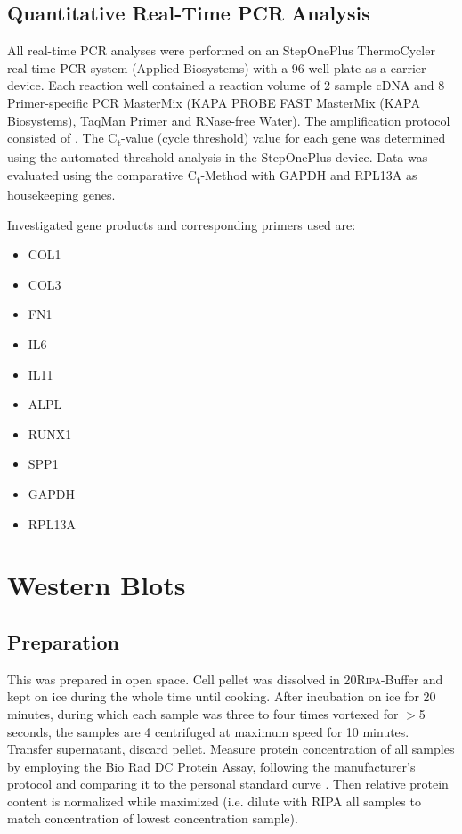 \subsection{Quantitative Real-Time PCR Analysis}

All real-time PCR analyses were performed on an StepOnePlus  ThermoCycler real-time PCR system (Applied Biosystems) with a 96-well plate as a carrier device. Each reaction well contained a reaction volume of 2\mul{} sample cDNA and 8\mul{} Primer-specific PCR MasterMix (KAPA PROBE FAST MasterMix (KAPA Biosystems), TaqMan\textregistered{} Primer and RNase-free Water). The amplification protocol consisted of . The C\textsubscript{t}-value (cycle threshold) value for each gene was determined using the automated threshold analysis in the StepOnePlus device. Data was evaluated using the comparative C\textsubscript{t}-Method with GAPDH and RPL13A as housekeeping genes.

Investigated gene products and corresponding primers used are: 
\begin{itemize}
\item COL1
\item COL3
\item FN1
\item IL6
\item IL11
\item ALPL
\item RUNX1
\item SPP1
\item GAPDH 
\item RPL13A
\end{itemize}

\section{Western Blots}
\subsection{Preparation}
This was prepared in open space. 
Cell pellet was dissolved in 20\mul \textsc{Ripa}-Buffer and kept on ice during the whole time until cooking. After incubation on ice for 20 minutes, during which each sample was three to four times vortexed for $>$5 seconds, the samples are 4 \degC centrifuged at maximum speed for 10 minutes. Transfer supernatant, discard pellet. Measure protein concentration of all samples by employing the Bio Rad DC Protein Assay, following the manufacturer's protocol and comparing it to the personal standard curve . Then relative protein content is normalized while maximized (i.e. dilute with RIPA all samples to match concentration of lowest concentration sample). 

